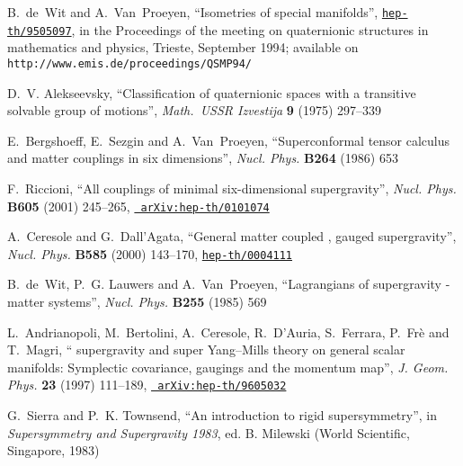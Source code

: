 \documentclass[a4paper,11pt,twoside]{article}
\begin{document}
\begin{thebibliography}{10}
{\sc B.~de~Wit and A.~Van~Proeyen}, ``Isometries of special manifolds'',
  \href{http://www.arXiv.org/abs/hep-th/9505097}{{\tt hep-th/9505097}},
in the Proceedings of the meeting on quaternionic structures in
mathematics and
  physics, Trieste, September 1994; available on
  \verb+http://www.emis.de/proceedings/QSMP94/+

{\sc D.~V. Alekseevsky}, ``Classification of quaternionic spaces with a
  transitive solvable group of motions'',  {\sl Math.\ USSR Izvestija} {\bf 9}
  (1975)
297--339

{\sc E.~Bergshoeff, E.~Sezgin  and A.~Van~Proeyen}, ``Superconformal
tensor
  calculus and matter couplings in six dimensions'',  {\sl Nucl. Phys.} {\bf
  B264} (1986)
653

{\sc F.~Riccioni}, ``All couplings of minimal six-dimensional
supergravity'',
  {\sl Nucl. Phys.} {\bf B605} (2001) 245--265,
\href{http://www.arXiv.org/abs/arXiv:hep-th/0101074}{{\tt
  arXiv:hep-th/0101074}}

{\sc A.~Ceresole and G.~Dall'Agata}, ``General matter coupled \coordHE{},
  \coordHE{} gauged supergravity'',  {\sl Nucl. Phys.} {\bf B585} (2000) 143--170,
\href{http://www.arXiv.org/abs/hep-th/0004111}{{\tt hep-th/0004111}}

{\sc B.~de~Wit, P.~G. Lauwers  and A.~Van~Proeyen}, ``Lagrangians of
\coordHE{}
  supergravity - matter systems'',  {\sl Nucl. Phys.} {\bf B255} (1985)
569

{\sc L.~Andrianopoli, M.~Bertolini, A.~Ceresole, R.~D'Auria, S.~Ferrara,
  P.~Fr{\`e}  and T.~Magri}, ``\coordHE{} supergravity and \coordHE{} super
  Yang--Mills theory on general scalar manifolds: Symplectic covariance,
  gaugings and the momentum map'',  {\sl J. Geom. Phys.} {\bf 23} (1997)
  111--189,
\href{http://www.arXiv.org/abs/arXiv:hep-th/9605032}{{\tt
  arXiv:hep-th/9605032}}

{\sc G.~Sierra and P.~K. Townsend}, ``An introduction to \coordHE{} rigid
  supersymmetry'',
in {\em Supersymmetry and Supergravity 1983}, ed. B. Milewski (World
  Scientific, Singapore, 1983)


\end{thebibliography}
\end{document}

